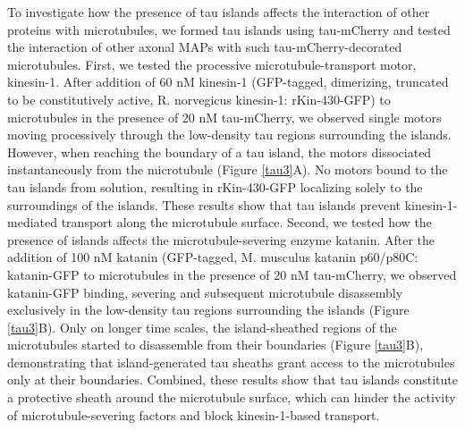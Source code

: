 To investigate how the presence of tau islands affects the interaction of other proteins with microtubules, we formed tau islands using tau-mCherry and tested the interaction of other axonal MAPs with such tau-mCherry-decorated microtubules. First, we tested the processive microtubule-transport motor, kinesin-1. After addition of 60 nM kinesin-1 (GFP-tagged, dimerizing, truncated to be constitutively active, R. norvegicus kinesin-1: rKin-430-GFP) to microtubules in the presence of 20 nM tau-mCherry, we observed single motors moving processively through the low-density tau regions surrounding the islands. However, when reaching the boundary of a tau island, the motors dissociated instantaneously from the microtubule (Figure \ref{tau3}A). No motors bound to the tau islands from solution, resulting in rKin-430-GFP localizing solely to the surroundings of the islands. These results show that tau islands prevent kinesin-1-mediated transport along the microtubule surface. Second, we tested how the presence of islands affects the microtubule-severing enzyme katanin. After the addition of 100 nM katanin (GFP-tagged, M. musculus katanin p60/p80C: katanin-GFP\parencite{Jiang2017} to microtubules in the presence of 20 nM tau-mCherry, we observed katanin-GFP binding, severing and subsequent microtubule disassembly exclusively in the low-density tau regions surrounding the islands (Figure \ref{tau3}B). Only on longer time scales, the island-sheathed regions of the microtubules started to disassemble from their boundaries (Figure \ref{tau3}B), demonstrating that island-generated tau sheaths grant access to the microtubules only at their boundaries. Combined, these results show that tau islands constitute a protective sheath around the microtubule surface, which can hinder the activity of microtubule-severing factors and block kinesin-1-based transport. 

